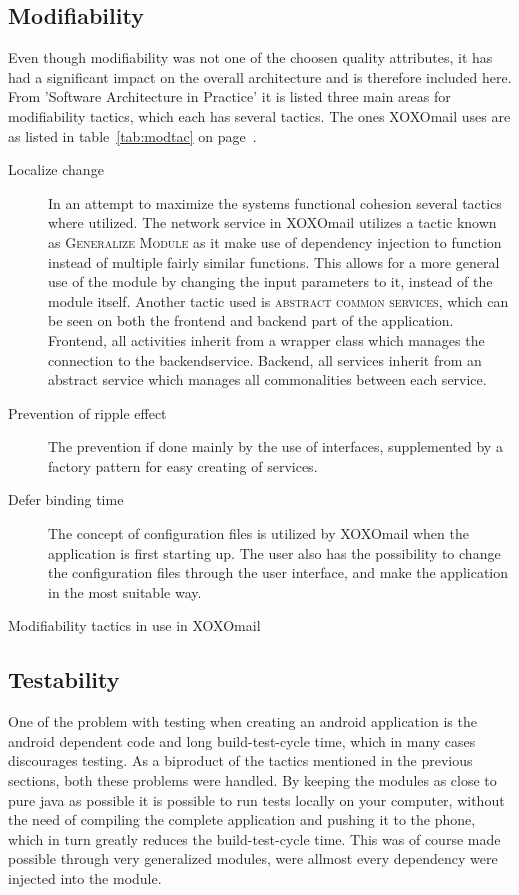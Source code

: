 	\subsection{Modifiability}
		Even though modifiability was not one of the choosen quality attributes, it has had a significant impact on the overall architecture and is therefore included here. From 'Software Architecture in Practice'\cite[p. 111]{bib:archi} it is listed three main areas for modifiability tactics, which each has several tactics. The ones XOXOmail uses are as listed in table~\ref{tab:modtac} on page~\pageref{tab:modtac}.
		\begin{table}[H]
			\begin{description}
				\item[Localize change] In an attempt to maximize the systems functional cohesion several tactics where utilized. The network service in XOXOmail utilizes a tactic known as \textsc{Generalize Module} as it make use of dependency injection to function instead of multiple fairly similar functions. This allows for a more general use of the module by changing the input parameters to it, instead of the module itself. Another tactic used is \textsc{abstract common services}, which can be seen on both the frontend and backend part of the application. Frontend, all activities inherit from a wrapper class which manages the connection to the backendservice. Backend, all services inherit from an abstract service which manages all commonalities between each service. 
				\item[Prevention of ripple effect] The prevention if done mainly by the use of interfaces, supplemented by a factory pattern for easy creating of services. 
				\item[Defer binding time] The concept of configuration files is utilized by XOXOmail when the application is first starting up. The user also has the possibility to change the configuration files through the user interface, and make the application in the most suitable way. 
			\end{description}
			\caption{Modifiability tactics in use in XOXOmail}
			\label{tab:modtac}
		\end{table}
		
	\subsection{Testability}
		One of the problem with testing when creating an android application is the android dependent code and long build-test-cycle time, which in many cases discourages testing. As a biproduct of the tactics mentioned in the previous sections, both these problems were handled. By keeping the modules as close to pure java as possible it is possible to run tests locally on your computer, without the need of compiling the complete application and pushing it to the phone, which in turn greatly reduces the build-test-cycle time. This was of course made possible through very generalized modules, were allmost every dependency were injected into the module. 
		
